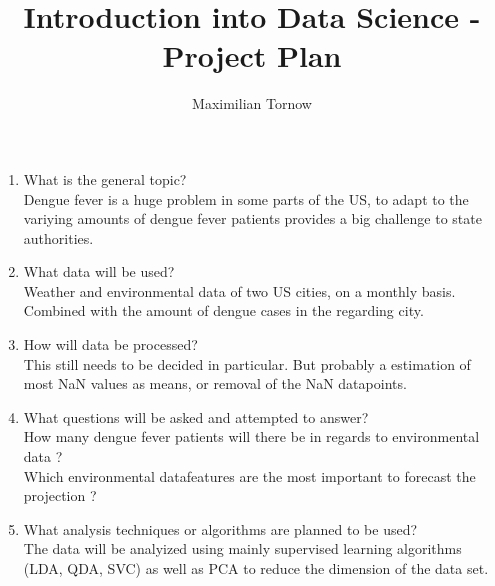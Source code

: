\documentclass[12pt]{article}
\title{Introduction into Data Science - Project Plan}
\author{Maximilian Tornow}
\begin{document}
	\maketitle
	\begin{enumerate}
		\item What is the general topic?\\
		Dengue fever is a huge problem in some parts of the US, to adapt to the variying amounts of dengue fever patients provides a big challenge to state authorities. \\
		\item What data will be used?\\
		Weather and environmental data of two US cities, on a monthly basis. Combined with the amount of dengue cases in the regarding city.\\
		\item How will data be processed?\\
		This still needs to be decided in particular. But probably a estimation of most NaN values as means, or removal of the NaN datapoints.\\
		\item What questions will be asked and attempted to answer?\\
		How many dengue fever patients will there be in regards to environmental data ?\\
		Which environmental datafeatures are the most important to forecast the projection ?\\
		\item What analysis techniques or algorithms are planned to be used?\\
		The data will be analyized using mainly supervised learning algorithms (LDA, QDA, SVC) as well as PCA to reduce the dimension of the data set. 
	\end{enumerate}
\end{document}
